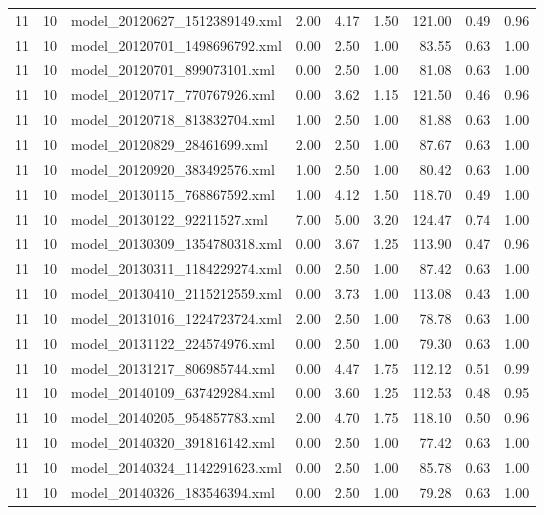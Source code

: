 \begin{table}[ht]
\begin{tabular}{rrlrrrrrr}
   11 &  10 & model\_20120627\_1512389149.xml & 2.00 & 4.17 & 1.50 & 121.00 & 0.49 & 0.96 \\ 
   11 &  10 & model\_20120701\_1498696792.xml & 0.00 & 2.50 & 1.00 & 83.55 & 0.63 & 1.00 \\ 
   11 &  10 & model\_20120701\_899073101.xml & 0.00 & 2.50 & 1.00 & 81.08 & 0.63 & 1.00 \\ 
   11 &  10 & model\_20120717\_770767926.xml & 0.00 & 3.62 & 1.15 & 121.50 & 0.46 & 0.96 \\ 
   11 &  10 & model\_20120718\_813832704.xml & 1.00 & 2.50 & 1.00 & 81.88 & 0.63 & 1.00 \\ 
   11 &  10 & model\_20120829\_28461699.xml & 2.00 & 2.50 & 1.00 & 87.67 & 0.63 & 1.00 \\ 
   11 &  10 & model\_20120920\_383492576.xml & 1.00 & 2.50 & 1.00 & 80.42 & 0.63 & 1.00 \\ 
   11 &  10 & model\_20130115\_768867592.xml & 1.00 & 4.12 & 1.50 & 118.70 & 0.49 & 1.00 \\ 
   11 &  10 & model\_20130122\_92211527.xml & 7.00 & 5.00 & 3.20 & 124.47 & 0.74 & 1.00 \\ 
   11 &  10 & model\_20130309\_1354780318.xml & 0.00 & 3.67 & 1.25 & 113.90 & 0.47 & 0.96 \\ 
   11 &  10 & model\_20130311\_1184229274.xml & 0.00 & 2.50 & 1.00 & 87.42 & 0.63 & 1.00 \\ 
   11 &  10 & model\_20130410\_2115212559.xml & 0.00 & 3.73 & 1.00 & 113.08 & 0.43 & 1.00 \\ 
   11 &  10 & model\_20131016\_1224723724.xml & 2.00 & 2.50 & 1.00 & 78.78 & 0.63 & 1.00 \\ 
   11 &  10 & model\_20131122\_224574976.xml & 0.00 & 2.50 & 1.00 & 79.30 & 0.63 & 1.00 \\ 
   11 &  10 & model\_20131217\_806985744.xml & 0.00 & 4.47 & 1.75 & 112.12 & 0.51 & 0.99 \\ 
   11 &  10 & model\_20140109\_637429284.xml & 0.00 & 3.60 & 1.25 & 112.53 & 0.48 & 0.95 \\ 
   11 &  10 & model\_20140205\_954857783.xml & 2.00 & 4.70 & 1.75 & 118.10 & 0.50 & 0.96 \\ 
   11 &  10 & model\_20140320\_391816142.xml & 0.00 & 2.50 & 1.00 & 77.42 & 0.63 & 1.00 \\ 
   11 &  10 & model\_20140324\_1142291623.xml & 0.00 & 2.50 & 1.00 & 85.78 & 0.63 & 1.00 \\ 
   11 &  10 & model\_20140326\_183546394.xml & 0.00 & 2.50 & 1.00 & 79.28 & 0.63 & 1.00 \\ 

\end{tabular}
\end{table}
